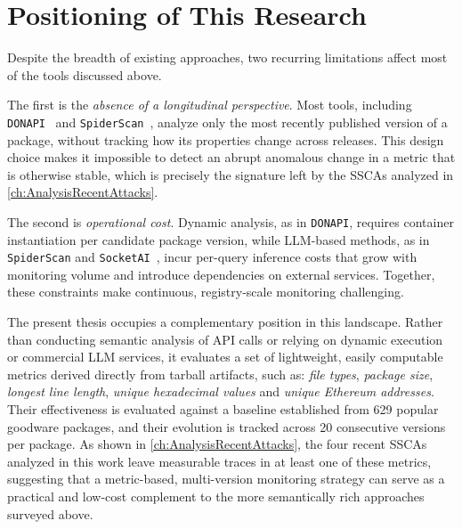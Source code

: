 \section{Positioning of This Research}
\label{sec:positioning}

Despite the breadth of existing approaches, 
two recurring limitations affect most of the tools discussed above.

The first is the \emph{absence of a longitudinal perspective}.
Most tools, including \texttt{DONAPI}~\cite{huang2024donapimaliciousnpmpackages} and \texttt{SpiderScan}~\cite{10.1145/3691620.3695492},
analyze only the most recently published version of a package, without tracking how its properties change across releases. 
This design choice makes it impossible to detect an abrupt anomalous change in a metric that is otherwise stable, 
which is precisely the signature left by the \acp{SSCA} analyzed in \cref{ch:AnalysisRecentAttacks}.

The second is \emph{operational cost}. 
Dynamic analysis, as in \texttt{DONAPI}, requires container instantiation per candidate package version,
while \ac{LLM}-based methods, as in \texttt{SpiderScan} and \texttt{SocketAI}~\cite{zahan2025leveraginglargelanguagemodels}, 
incur per-query inference costs that grow with monitoring volume and introduce dependencies on external services.
Together, these constraints make continuous, registry-scale monitoring challenging.

The present thesis occupies a complementary position in this landscape.
Rather than conducting semantic analysis of \ac{API} calls or relying on dynamic execution or commercial \ac{LLM} services, 
it evaluates a set of lightweight, easily computable metrics derived directly from tarball artifacts, such as:
\emph{file types}, \emph{package size}, \emph{longest line length}, \emph{unique hexadecimal values} and \emph{unique Ethereum addresses}.
Their effectiveness is evaluated against a baseline established from 629 popular goodware packages, 
and their evolution is tracked across 20 consecutive versions per package.
As shown in \cref{ch:AnalysisRecentAttacks}, 
the four recent \acp{SSCA} analyzed in this work leave measurable traces in at least one of these metrics, suggesting that a metric-based, 
multi-version monitoring strategy can serve as a practical and low-cost complement to the more semantically rich approaches surveyed above.